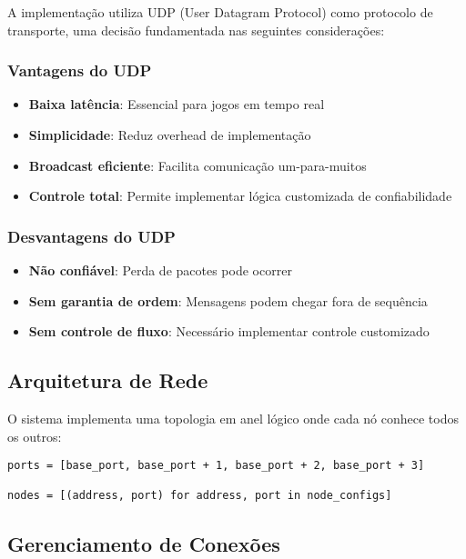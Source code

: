 \documentclass[12pt,a4paper]{article}
\begin{document}
A implementação utiliza UDP (User Datagram Protocol) como protocolo de transporte, uma decisão fundamentada nas seguintes considerações:

\subsubsection{Vantagens do UDP}
\begin{itemize}
    \item \textbf{Baixa latência}: Essencial para jogos em tempo real
    \item \textbf{Simplicidade}: Reduz overhead de implementação
    \item \textbf{Broadcast eficiente}: Facilita comunicação um-para-muitos
    \item \textbf{Controle total}: Permite implementar lógica customizada de confiabilidade
\end{itemize}

\subsubsection{Desvantagens do UDP}
\begin{itemize}
    \item \textbf{Não confiável}: Perda de pacotes pode ocorrer
    \item \textbf{Sem garantia de ordem}: Mensagens podem chegar fora de sequência
    \item \textbf{Sem controle de fluxo}: Necessário implementar controle customizado
\end{itemize}

\subsection{Arquitetura de Rede}

O sistema implementa uma topologia em anel lógico onde cada nó conhece todos os outros:

\begin{lstlisting}[caption=Configuração dos Nós]
ports = [base_port, base_port + 1, base_port + 2, base_port + 3]

nodes = [(address, port) for address, port in node_configs]
\end{lstlisting}

\subsection{Gerenciamento de Conexões}
\end{document}
